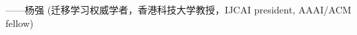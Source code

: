 \documentclass[a4paper]{article}
\begin{document}
——杨强 (迁移学习权威学者，香港科技大学教授，IJCAI president, AAAI/ACM fellow)

\newpage
\setcounter{page}{1}
\begingroup           
\begin{multicols}{2}[
	\setlength{\columnseprule}{.4pt}
	\setlength{\columnsep}{18pt}]
	\tableofcontents
\end{multicols}
\endgroup
\newpage























\end{document}
